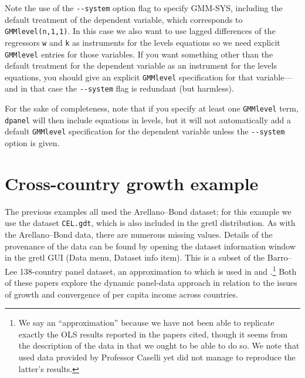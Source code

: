 Note the use of the \verb|--system| option flag to specify GMM-SYS,
including the default treatment of the dependent variable, which
corresponds to \texttt{GMMlevel(n,1,1)}. In this case we also want to
use lagged differences of the regressors \texttt{w} and \texttt{k} as
instruments for the levels equations so we need explicit
\texttt{GMMlevel} entries for those variables. If you want something
other than the default treatment for the dependent variable as an
instrument for the levels equations, you should give an explicit
\texttt{GMMlevel} specification for that variable---and in that case
the \verb|--system| flag is redundant (but harmless).

For the sake of completeness, note that if you specify at least one
\texttt{GMMlevel} term, \texttt{dpanel} will then include equations in
levels, but it will not automatically add a default \texttt{GMMlevel}
specification for the dependent variable unless the \verb|--system|
option is given.

\section{Cross-country growth example}
\label{sec:dpanel-growth}

The previous examples all used the Arellano--Bond dataset; for this
example we use the dataset \texttt{CEL.gdt}, which is also included in
the gretl distribution. As with the Arellano--Bond data, there are
numerous missing values.  Details of the provenance of the data can be
found by opening the dataset information window in the gretl GUI
(\textsf{Data} menu, \textsf{Dataset info} item). This is a subset of
the Barro--Lee 138-country panel dataset, an approximation to which is
used in \citet*{CEL96} and \citet*{Bond2001}.\footnote{We say an
  ``approximation'' because we have not been able to replicate exactly
  the OLS results reported in the papers cited, though it seems from
  the description of the data in \cite{CEL96} that we ought to be able
  to do so.  We note that \cite{Bond2001} used data provided by
  Professor Caselli yet did not manage to reproduce the latter's
  results.}  Both of these papers explore the dynamic panel-data
approach in relation to the issues of growth and convergence of per
capita income across countries.

